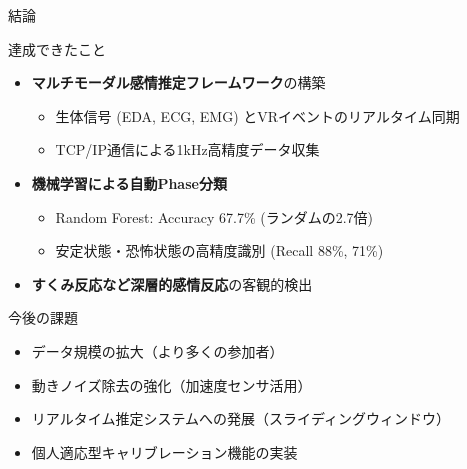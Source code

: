 \documentclass[aspectratio=169,10pt]{beamer}
\begin{document}
\begin{frame}{結論}
\begin{block}{達成できたこと}
\begin{itemize}
\item \textbf{マルチモーダル感情推定フレームワーク}の構築
\begin{itemize}
\item 生体信号 (EDA, ECG, EMG) とVRイベントのリアルタイム同期
\item TCP/IP通信による1kHz高精度データ収集
\end{itemize}
\item \textbf{機械学習による自動Phase分類}
\begin{itemize}
\item Random Forest: Accuracy 67.7\% (ランダムの2.7倍)
\item 安定状態・恐怖状態の高精度識別 (Recall 88\%, 71\%)
\end{itemize}
\item \textbf{すくみ反応など深層的感情反応}の客観的検出
\end{itemize}
\end{block}

\begin{alertblock}{今後の課題}
\begin{itemize}
\item データ規模の拡大（より多くの参加者）
\item 動きノイズ除去の強化（加速度センサ活用）
\item リアルタイム推定システムへの発展（スライディングウィンドウ）
\item 個人適応型キャリブレーション機能の実装
\end{itemize}
\end{alertblock}
\end{frame}
\end{document}

